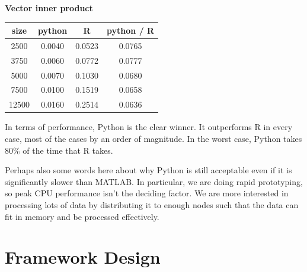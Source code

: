 \documentclass[%
  final,
  notitlepage,
  narroweqnarray,
  inline,
]{ieee}
\begin{document}
\begin{center}
\vspace{1em}
\textbf{Vector inner product} \\
\begin{tabular}{cccc}
size  & python  &  R       & python / R \\
  \hline
2500  & 0.0040 & 0.0523 & 0.0765 \\
3750  & 0.0060 & 0.0772 & 0.0777 \\
5000  & 0.0070 & 0.1030 & 0.0680 \\
7500  & 0.0100 & 0.1519 & 0.0658 \\
12500 & 0.0160 & 0.2514 & 0.0636 \\
\end{tabular}

\end{center}

In terms of performance, Python is the clear winner. It outperforms R in every
case, most of the cases by an order of magnitude. In the worst case, Python
takes 80\% of the time that R takes.

Perhaps also some words here about why Python is still acceptable even if it is
significantly slower than MATLAB. In particular, we are doing rapid
prototyping, so peak CPU performance isn't the deciding factor. We are more
interested in processing lots of data by distributing it to enough nodes such
that the data can fit in memory and be processed effectively.


\section{Framework Design}

%
%

\end{document}

